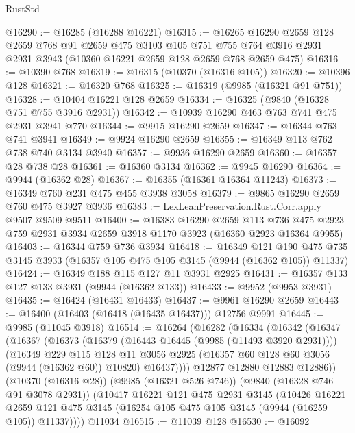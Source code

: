 \begin{lexlean}{RustStd}
\begin{coremodule}
@16290 := @16285 (@16288 @16221)
@16315 := @16265
    @16290
    @2659
    @128
    @2659
    @768
    @91
    @2659
    @475
    @3103
    @105
    @751
    @755
    @764
    @3916
    @2931
    @2931
    @3943
    (@10360 @16221 @2659 @128 @2659 @768 @2659 @475)
@16316 := @10390 @768
@16319 := @16315 (@10370 (@16316 @105))
@16320 := @10396 @128
@16321 := @16320 @768
@16325 := @16319 (@9985 (@16321 @91 @751))
@16328 := @10404 @16221 @128 @2659
@16334 := @16325 (@9840 (@16328 @751 @755 @3916 @2931))
@16342 := @10939 @16290 @463 @763 @741 @475 @2931 @3941 @770
@16344 := @9915 @16290 @2659
@16347 := @16344 @763 @741 @3941
@16349 := @9924 @16290 @2659
@16355 := @16349 @113 @762 @738 @740 @3134 @3940
@16357 := @9936 @16290 @2659
@16360 := @16357 @28 @738 @28
@16361 := @16360 @3134
@16362 := @9945 @16290
@16364 := @9944 (@16362 @28)
@16367 := @16355 (@16361 @16364 @11243)
@16373 := @16349 @760 @231 @475 @455 @3938 @3058
@16379 := @9865 @16290 @2659 @760 @475 @3927 @3936
@16383 := LexLeanPreservation.Rust.Corr.apply @9507 @9509 @9511
@16400 := @16383
    @16290
    @2659
    @113
    @736
    @475
    @2923
    @759
    @2931
    @3934
    @2659
    @3918
    @1170
    @3923
    (@16360 @2923 @16364 @9955)
@16403 := @16344 @759 @736 @3934
@16418 := @16349
    @121
    @190
    @475
    @735
    @3145
    @3933
    (@16357 @105 @475 @105 @3145 (@9944 (@16362 @105)) @11337)
@16424 := @16349 @188 @115 @127 @11 @3931 @2925
@16431 := @16357 @133 @127 @133 @3931 (@9944 (@16362 @133))
@16433 := @9952 (@9953 @3931)
@16435 := @16424 (@16431 @16433)
@16437 := @9961 @16290 @2659
@16443 := @16400 (@16403 (@16418 (@16435 @16437))) @12756 @9991
@16445 := @9985 (@11045 @3918)
@16514 := @16264
    (@16282
      (@16334
        (@16342
          (@16347
            (@16367
              (@16373
                (@16379 (@16443 @16445 (@9985 (@11493 @3920 @2931))))
                (@16349
                  @229
                  @115
                  @128
                  @11
                  @3056
                  @2925
                  (@16357 @60 @128 @60 @3056 (@9944 (@16362 @60)) @10820)
                  @16437))))
          @12877
          @12880
          @12883
          @12886))
      (@10370 (@16316 @28))
      (@9985 (@16321 @526 @746))
      (@9840 (@16328 @746 @91 @3078 @2931))
      (@10417
        @16221
        @121
        @475
        @2931
        @3145
        (@10426
          @16221
          @2659
          @121
          @475
          @3145
          (@16254 @105 @475 @105 @3145 (@9944 (@16259 @105)) @11337))))
    @11034
@16515 := @11039 @128
@16530 := @16092

\end{coremodule}
\end{lexlean}
